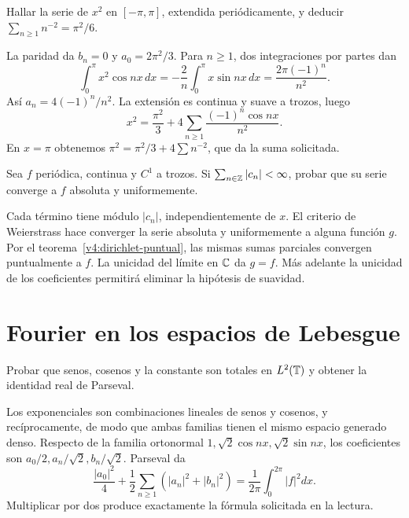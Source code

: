 \begin{ejercicio}\label{ej:v4-l04-3}
Hallar la serie de $x^2$ en $[-\pi,\pi]$, extendida periódicamente, y deducir $\sum_{n\geq1}n^{-2}=\pi^2/6$.
\end{ejercicio}
\begin{solucion}
La paridad da $b_n=0$ y $a_0=2\pi^2/3$. Para $n\geq1$, dos integraciones por partes dan
\[
 \int_0^\pi x^2\cos nx\,dx
 =-\frac2n\int_0^\pi x\sin nx\,dx
 =\frac{2\pi(-1)^n}{n^2}.
\]
Así $a_n=4(-1)^n/n^2$. La extensión es continua y suave a trozos, luego
\[
 x^2=\frac{\pi^2}3+4\sum_{n\geq1}\frac{(-1)^n\cos nx}{n^2}.
\]
En $x=\pi$ obtenemos $\pi^2=\pi^2/3+4\sum n^{-2}$, que da la suma solicitada.
\end{solucion}

\begin{ejercicio}\label{ej:v4-l04-4}
Sea $f$ periódica, continua y $C^1$ a trozos. Si $\sum_{n\in\mathbb Z}|c_n|<\infty$, probar que su serie converge a $f$ absoluta y uniformemente.
\end{ejercicio}
\begin{solucion}
Cada término tiene módulo $|c_n|$, independientemente de $x$. El criterio de Weierstrass hace converger la serie absoluta y uniformemente a alguna función $g$. Por el teorema~\ref{v4:dirichlet-puntual}, las mismas sumas parciales convergen puntualmente a $f$. La unicidad del límite en $\mathbb C$ da $g=f$. Más adelante la unicidad de los coeficientes permitirá eliminar la hipótesis de suavidad.
\end{solucion}

\chapter{Fourier en los espacios de Lebesgue}

\begin{ejercicio}\label{ej:v4-l06-1}
Probar que senos, cosenos y la constante son totales en $L^2(\mathbb T)$ y obtener la identidad real de Parseval.
\end{ejercicio}
\begin{solucion}
Los exponenciales son combinaciones lineales de senos y cosenos, y recíprocamente, de modo que ambas familias tienen el mismo espacio generado denso. Respecto de la familia ortonormal $1,\sqrt2\cos nx,\sqrt2\sin nx$, los coeficientes son $a_0/2,a_n/\sqrt2,b_n/\sqrt2$. Parseval da
\[
 \frac{|a_0|^2}4+\frac12\sum_{n\geq1}(|a_n|^2+|b_n|^2)
 =\frac1{2\pi}\int_0^{2\pi}|f|^2dx.
\]
Multiplicar por dos produce exactamente la fórmula solicitada en la lectura.
\end{solucion}

